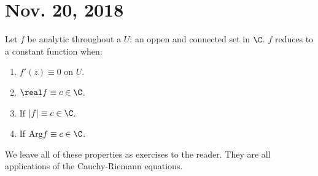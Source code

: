 \documentclass[notes]{subfile}
\begin{document}
\section{Nov. 20, 2018}

Let $f$ be analytic throughout a  $U$: an oppen and connected set in $\C$.
$f$ reduces to a constant function when:
\begin{enumerate}

\item $f'(z) \equiv 0$ on $U$.

\item $\real f \equiv c \in \C$.

\item If $|f| \equiv c \in \C$.

\item If ${\rm Arg} f \equiv c \in \C$.

\end{enumerate}

\noindent
We leave all of these properties as exercises to the reader.
They are all applications of the Cauchy-Riemann equations.
\end{document}
